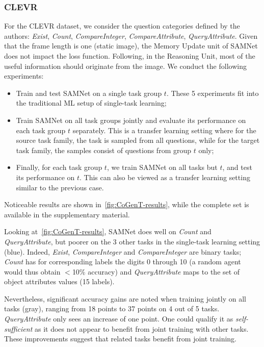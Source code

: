 \subsubsection{CLEVR}
\label{sec:reasoning-clevr}
For the CLEVR dataset, we consider the question categories defined by the authors: \textit{Exist}, \textit{Count}, \textit{CompareInteger}, \textit{CompareAttribute}, \textit{QueryAttribute}. Given that the frame length is one (static image), the Memory Update unit of SAMNet does not impact the loss function. Following, in the Reasoning Unit, most of the useful information should originate from the image. We conduct the following experiments:
\begin{itemize}
	\compresslist
	\item Train and test SAMNet on a single task group $t$. These 5 experiments fit into the traditional ML setup of single-task learning;
	\item Train SAMNet on all task groups jointly and evaluate its performance on each task group $t$ separately.
	This is a transfer learning setting where for the source task family, the task is sampled from all questions,
	while for the target task family, the samples consist of questions from group $t$ only;
	\item Finally, for each task group $t$, we train SAMNet on all tasks but $t$, and test its performance on $t$.
	This can also be viewed as a transfer learning setting similar to the previous case.
\end{itemize}

Noticeable results are shown in~\cref{fig:CoGenT-results}, while the complete set is available in the supplementary material.%


Looking at~\cref{fig:CoGenT-results}, SAMNet does well on \textit{Count} and \textit{QueryAttribute}, but poorer on the 3 other tasks in the single-task learning setting (blue). Indeed, \textit{Exist}, \textit{CompareInteger} and \textit{CompareInteger} are binary tasks; \textit{Count} has for corresponding labels the digits 0 through 10 (a random agent would thus obtain $<$10\% accuracy) and \textit{QueryAttribute} maps to the set of object attributes values (15 labels).

Nevertheless, significant accuracy gains are noted when training jointly on all tasks (gray), ranging from 18 points to 37 points on 4 out of 5 tasks. \textit{QueryAttribute} only sees an increase of one point. One could qualify it as \textit{self-sufficient} as it does not appear to benefit from joint training with other tasks. These improvements suggest that related tasks benefit from joint training.

